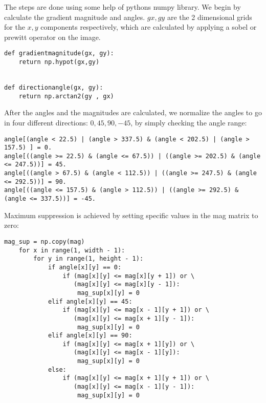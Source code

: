 The steps are done using some help of pythons numpy library. We begin by calculate the gradient magnitude and angles. $gx,gy$ are the 2 dimensional grids for the $x,y$ components respectively, which are calculated by applying a sobel or prewitt operator on the image.
\begin{verbatim}
def gradientmagnitude(gx, gy):
    return np.hypot(gx,gy)


def directionangle(gx, gy):
    return np.arctan2(gy , gx)
\end{verbatim}

After the angles and the magnitudes are calculated, we normalize the angles to go in four different directions: $0,45,90,-45$, by simply checking the angle range:
\begin{verbatim}
angle[(angle < 22.5) | (angle > 337.5) & (angle < 202.5) | (angle > 157.5) ] = 0.
angle[((angle >= 22.5) & (angle <= 67.5)) | ((angle >= 202.5) & (angle <= 247.5))] = 45.
angle[((angle > 67.5) & (angle < 112.5)) | ((angle >= 247.5) & (angle <= 292.5))] = 90.
angle[((angle <= 157.5) & (angle > 112.5)) | ((angle >= 292.5) & (angle <= 337.5))] = -45.
\end{verbatim}

Maximum suppression is achieved by setting specific values in the mag matrix to zero:

\begin{verbatim}
mag_sup = np.copy(mag)
    for x in range(1, width - 1):
        for y in range(1, height - 1):
            if angle[x][y] == 0:
                if (mag[x][y] <= mag[x][y + 1]) or \
                   (mag[x][y] <= mag[x][y - 1]):
                    mag_sup[x][y] = 0
            elif angle[x][y] == 45:
                if (mag[x][y] <= mag[x - 1][y + 1]) or \
                   (mag[x][y] <= mag[x + 1][y - 1]):
                    mag_sup[x][y] = 0
            elif angle[x][y] == 90:
                if (mag[x][y] <= mag[x + 1][y]) or \
                   (mag[x][y] <= mag[x - 1][y]):
                    mag_sup[x][y] = 0
            else:
                if (mag[x][y] <= mag[x + 1][y + 1]) or \
                   (mag[x][y] <= mag[x - 1][y - 1]):
                    mag_sup[x][y] = 0
\end{verbatim}

